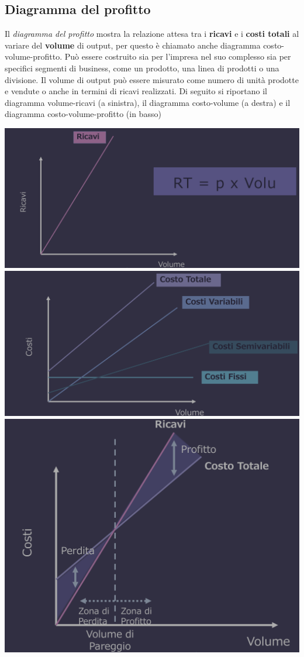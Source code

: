 \documentclass{article}
\begin{document}
\subsection{Diagramma del profitto}
Il \textit{diagramma del profitto} mostra la relazione attesa tra i \textbf{ricavi} e i \textbf{costi totali} al variare del \textbf{volume} di output, per questo è chiamato anche diagramma costo-volume-profitto. Può essere costruito sia per l'impresa nel suo complesso sia per specifici segmenti di business, come un prodotto, una linea di prodotti o una divisione. Il volume di output può essere misurato come numero di unità prodotte e vendute o anche in termini di ricavi realizzati.
Di seguito si riportano il diagramma volume-ricavi (a sinistra), il diagramma costo-volume (a destra) e il diagramma costo-volume-profitto (in basso)
\begin{center}
    \includegraphics[scale=0.25]{Image/DiagrammaProfitto_1.png}
    \includegraphics[scale=0.25]{Image/DiagrammaProfitto_2.png}
    \includegraphics[scale=0.3]{Image/DiagrammaProfitto_3.png}
\end{center}
\end{document}
